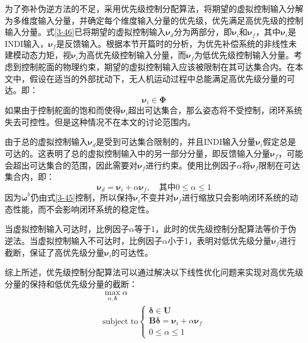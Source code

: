 为了弥补伪逆方法的不足，采用优先级控制分配算法，将期望的虚拟控制输入分解为多维度输入分量，并确定每个维度输入分量的优先级，优先满足高优先级的控制输入分量。式\eqref{3-46}已将期望的虚拟控制输入$\boldsymbol{\nu}_d$分为两部分，即$\boldsymbol{\nu}_i$和$\boldsymbol{\nu}_f$，其中$\boldsymbol{\nu}_i$是INDI输入，$\boldsymbol{\nu}_f$是反馈输入。根据本节开篇时的分析，为优先补偿系统的非线性未建模动态力矩，视$\boldsymbol{\nu}_i$为高优先级控制输入分量，而$\boldsymbol{\nu}_f$为低优先级控制输入分量。考虑到控制舵面的物理约束，期望的虚拟控制输入应该被限制在其可达集合内。在本文中，假设在适当的外部扰动下，无人机运动过程中总能满足高优先级分量的可达。即：
\begin{equation}
    \boldsymbol{\nu}_i\in\boldsymbol\Phi
    \label{3-58}
\end{equation}
如果由于控制舵面的饱和而使得$\boldsymbol{\nu}_i$超出可达集合，那么姿态将不受控制，闭环系统失去可控性。但是这种情况不在本文的讨论范围内。

由于总的虚拟控制输入$\boldsymbol{\nu}_d$是受到可达集合限制的，并且INDI输入分量$\boldsymbol{\nu}_i$假定总是可达的。这表明了总的虚拟控制输入中的另一部分分量，即反馈输入分量$\boldsymbol{\nu}_f$，可能会超出可达集合的范围，因此需要对$\boldsymbol{\nu}_f$进行约束。使用比例因子$\alpha$将$\boldsymbol{\nu}_f$限制在可达集合内，即：
\begin{equation}
    \boldsymbol{\nu}_d=\boldsymbol{\nu}_i+\alpha\boldsymbol{\nu}_f,\quad\text{其中}0\leq\alpha\leq1
    \label{3-59}
\end{equation}
因为$\dot{\boldsymbol{\omega}}^b$仍由式\eqref{3-45}控制，所以保持$\boldsymbol{\nu}_i$不变并对$\boldsymbol{\nu}_f$进行缩放只会影响闭环系统的动态性能，而不会影响闭环系统的稳定性。

当虚拟控制输入可达时，比例因子$\alpha$等于1，此时的优先级控制分配算法等价于伪逆法。当虚拟控制输入不可达时，比例因子$\alpha$小于1，表明对低优先级分量$\boldsymbol{\nu}_f$进行截断，保证了高优先级分量$\boldsymbol{\nu}_i$的可达性。

综上所述，优先级控制分配算法可以通过解决以下线性优化问题来实现对高优先级分量的保持和低优先级分量的截断：
\begin{equation}
    \begin{gathered}
        \max_{\alpha,\boldsymbol{\delta}}\alpha \\
        \text{subject  to}
        \begin{cases}
        \boldsymbol{\delta}\in\boldsymbol{U} \\
        \boldsymbol{B}\boldsymbol{\delta}=\boldsymbol{\nu}_i+\alpha\boldsymbol{\nu}_f \\
        0\leq\alpha\leq1
        \end{cases}
    \end{gathered}
    \label{3-60}
\end{equation}

